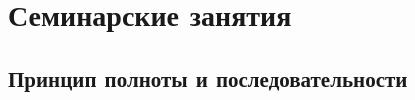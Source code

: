 \documentclass[12pt,a5paper, twoside,reqno, openany]{book}
\numberwithin{equation}{section}
\theoremstyle{definition}
\begin{document}
%

%

%

%

%

%

%

%

%

\part{Семинарские занятия}
\chapter{Принцип полноты и последовательности}
%


\end{document}

